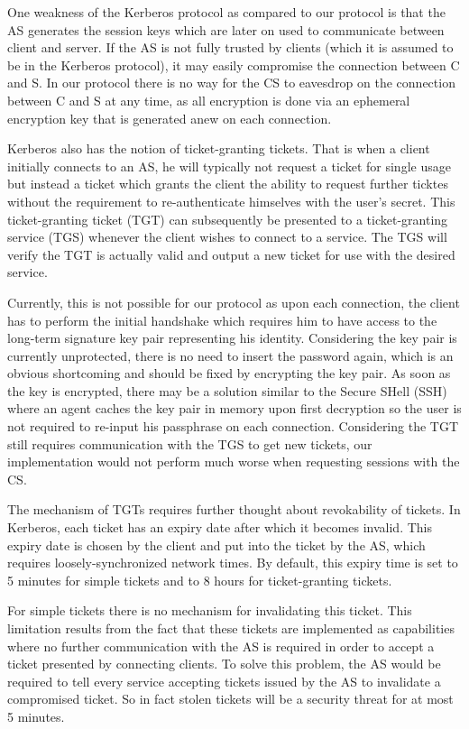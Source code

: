 One weakness of the Kerberos protocol as compared to our protocol is that the AS generates the session keys which are later on used to communicate between client and server.
If the AS is not fully trusted by clients (which it is assumed to be in the Kerberos protocol), it may easily compromise the connection between C and S.
In our protocol there is no way for the CS to eavesdrop on the connection between C and S at any time, as all encryption is done via an ephemeral encryption key that is generated anew on each connection.

\bigskip

Kerberos also has the notion of ticket-granting tickets.
That is when a client initially connects to an AS, he will typically not request a ticket for single usage but instead a ticket which grants the client the ability to request further ticktes without the requirement to re-authenticate himselves with the user's secret.
This ticket-granting ticket (TGT) can subsequently be presented to a ticket-granting service (TGS) whenever the client wishes to connect to a service.
The TGS will verify the TGT is actually valid and output a new ticket for use with the desired service.

Currently, this is not possible for our protocol as upon each connection, the client has to perform the initial handshake which requires him to have access to the long-term signature key pair representing his identity.
Considering the key pair is currently unprotected, there is no need to insert the password again, which is an obvious shortcoming and should be fixed by encrypting the key pair.
As soon as the key is encrypted, there may be a solution similar to the Secure SHell (SSH) where an agent caches the key pair in memory upon first decryption so the user is not required to re-input his passphrase on each connection.
Considering the TGT still requires communication with the TGS to get new tickets, our implementation would not perform much worse when requesting sessions with the CS.

The mechanism of TGTs requires further thought about revokability of tickets.
In Kerberos, each ticket has an expiry date after which it becomes invalid.
This expiry date is chosen by the client and put into the ticket by the AS, which requires loosely-synchronized network times.
By default, this expiry time is set to 5 minutes for simple tickets and to 8 hours for ticket-granting tickets.

For simple tickets there is no mechanism for invalidating this ticket.
This limitation results from the fact that these tickets are implemented as capabilities where no further communication with the AS is required in order to accept a ticket presented by connecting clients.
To solve this problem, the AS would be required to tell every service accepting tickets issued by the AS to invalidate a compromised ticket.
So in fact stolen tickets will be a security threat for at most 5 minutes.

